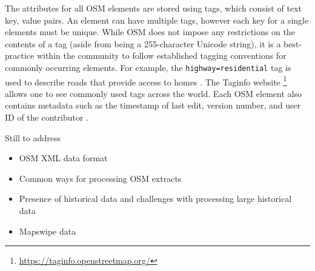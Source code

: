 The attributes for all OSM elements are stored using tags, which consist of text key, value pairs. An element can have multiple tags, however each key for a single elements must be unique. While OSM does not impose any restrictions on the contents of a tag (aside from being a 255-character Unicode string), it is a best-practice within the community to follow established tagging conventions for commonly occurring elements. For example, the \texttt{highway=residential} tag is used to describe roads that provide access to homes \parencite{noauthor_elements_nodate}. The Taginfo website \footnote{\url{https://taginfo.openstreetmap.org/}} allows one to see commonly used tags across the world. Each OSM element also contains metadata such as the timestamp of last edit, version number, and user ID of the contributor \parencite{noauthor_elements_nodate}. 

Still to address
\begin{itemize}
    \item OSM XML data format
    \item Common ways for processing OSM extracts
    \item Presence of historical data and challenges with processing large historical data
    \item Mapswipe data
\end{itemize}


    


